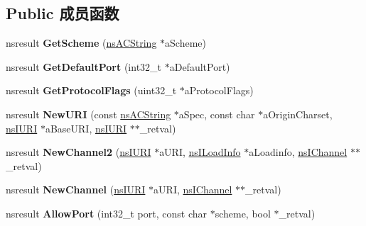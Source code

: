 \subsection*{Public 成员函数}
\begin{DoxyCompactItemize}
\item 
\mbox{\label{interfacens_i_protocol_handler_ae4fa32a8bfa4f831f9c96a9248355592}} 
nsresult {\bfseries Get\+Scheme} (\hyperlink{structns_c_string_container}{ns\+A\+C\+String} $\ast$a\+Scheme)
\item 
\mbox{\label{interfacens_i_protocol_handler_ad5e0b73ada2b659bf198aa1d19ee9e1b}} 
nsresult {\bfseries Get\+Default\+Port} (int32\+\_\+t $\ast$a\+Default\+Port)
\item 
\mbox{\label{interfacens_i_protocol_handler_a516a377fcee57dcc494a7de19c6883e6}} 
nsresult {\bfseries Get\+Protocol\+Flags} (uint32\+\_\+t $\ast$a\+Protocol\+Flags)
\item 
\mbox{\label{interfacens_i_protocol_handler_ac8701cb8ba12b744cb75b12f649cb218}} 
nsresult {\bfseries New\+U\+RI} (const \hyperlink{structns_c_string_container}{ns\+A\+C\+String} $\ast$a\+Spec, const char $\ast$a\+Origin\+Charset, \hyperlink{interfacens_i_u_r_i}{ns\+I\+U\+RI} $\ast$a\+Base\+U\+RI, \hyperlink{interfacens_i_u_r_i}{ns\+I\+U\+RI} $\ast$$\ast$\+\_\+retval)
\item 
\mbox{\label{interfacens_i_protocol_handler_a96ca187fc83873c46013dc71d99d260b}} 
nsresult {\bfseries New\+Channel2} (\hyperlink{interfacens_i_u_r_i}{ns\+I\+U\+RI} $\ast$a\+U\+RI, \hyperlink{interfacens_i_supports}{ns\+I\+Load\+Info} $\ast$a\+Loadinfo, \hyperlink{interfacens_i_channel}{ns\+I\+Channel} $\ast$$\ast$\+\_\+retval)
\item 
\mbox{\label{interfacens_i_protocol_handler_aff6a33214ab0a3a97b7d4f7802e04192}} 
nsresult {\bfseries New\+Channel} (\hyperlink{interfacens_i_u_r_i}{ns\+I\+U\+RI} $\ast$a\+U\+RI, \hyperlink{interfacens_i_channel}{ns\+I\+Channel} $\ast$$\ast$\+\_\+retval)
\item 
\mbox{\label{interfacens_i_protocol_handler_ae878478dbd9dce9b9ac514c13380d18c}} 
nsresult {\bfseries Allow\+Port} (int32\+\_\+t port, const char $\ast$scheme, bool $\ast$\+\_\+retval)
\end{DoxyCompactItemize}
